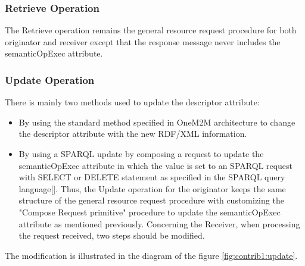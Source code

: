 \subsubsection*{Retrieve Operation}
The Retrieve operation remains the general resource request procedure for both originator and receiver except that the response message never includes the semanticOpExec attribute.
\subsubsection*{Update Operation}
There is mainly two methods used to update the descriptor attribute:
\begin{itemize}
\item By using the standard method specified in OneM2M architecture to change the descriptor attribute with the new RDF/XML information.
\item By using a SPARQL update by composing a request to update the semanticOpExec attribute in which the value is set to an SPARQL request with SELECT or DELETE statement as specified in the SPARQL query language[]. Thus, the Update operation for the originator keeps the same structure of the general resource request procedure with customizing the "Compose Request primitive" procedure to update the semanticOpExec attribute as mentioned previously.
Concerning the Receiver, when processing the request received, two steps should be modified. 
\end{itemize}
The modification is illustrated in the diagram of the figure \ref{fig:contrib1:update}.
